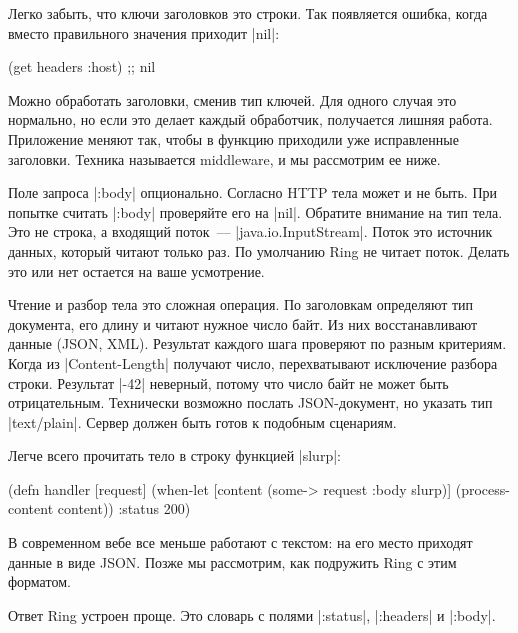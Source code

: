 Легко забыть, что ключи заголовков это строки. Так появляется ошибка, когда
вместо правильного значения приходит \spverb|nil|:

\begin{english}
  \begin{clojure}
(get headers :host) ;; nil
  \end{clojure}
\end{english}

Можно обработать заголовки, сменив тип ключей. Для одного случая это
нормально, но если это делает каждый обработчик, получается лишняя
работа. Приложение меняют так, чтобы в функцию приходили уже исправленные
заголовки. Техника называется middleware, и мы рассмотрим ее ниже.


Поле запроса \spverb|:body| опционально. Согласно HTTP тела может и не быть. При
попытке считать \spverb|:body| проверяйте его на \spverb|nil|. Обратите внимание
на тип тела. Это не строка, а входящий поток~---
\spverb|java.io.InputStream|. Поток это источник данных, который читают только
раз. По умолчанию Ring не читает поток. Делать это или нет остается на
ваше усмотрение.

Чтение и разбор тела это сложная операция. По заголовкам определяют тип
документа, его длину и читают нужное число байт. Из них восстанавливают данные
(JSON, XML). Результат каждого шага проверяют по разным критериям. Когда из
\spverb|Content-Length| получают число, перехватывают исключение разбора
строки. Результат \spverb|-42| неверный, потому что число байт не может быть
отрицательным. Технически возможно послать JSON-документ, но указать тип
\spverb|text/plain|. Сервер должен быть готов к подобным сценариям.

Легче всего прочитать тело в строку функцией \spverb|slurp|:

\begin{english}
  \begin{clojure}
(defn handler [request]
  (when-let [content (some-> request :body slurp)]
    (process-content content))
  {:status 200})
  \end{clojure}
\end{english}

В современном вебе все меньше работают с текстом: на его место приходят данные в
виде JSON. Позже мы рассмотрим, как подружить Ring с этим форматом.

Ответ Ring устроен проще. Это словарь с полями \spverb|:status|,
\spverb|:headers| и \spverb|:body|.

